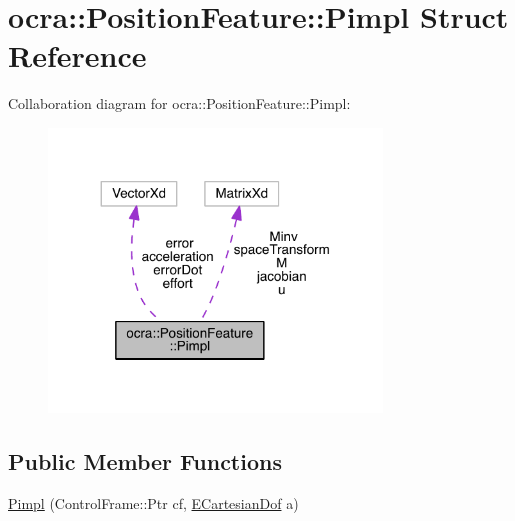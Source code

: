 \hypertarget{structocra_1_1PositionFeature_1_1Pimpl}{}\section{ocra\+:\+:Position\+Feature\+:\+:Pimpl Struct Reference}
\label{structocra_1_1PositionFeature_1_1Pimpl}


Collaboration diagram for ocra\+:\+:Position\+Feature\+:\+:Pimpl\+:\nopagebreak
\begin{figure}[H]
\begin{center}
\leavevmode
\includegraphics[width=251pt]{d0/d59/structocra_1_1PositionFeature_1_1Pimpl__coll__graph}
\end{center}
\end{figure}
\subsection*{Public Member Functions}
\begin{DoxyCompactItemize}
\item 
\hyperlink{structocra_1_1PositionFeature_1_1Pimpl_ad886f374a5f070290519a8ccbaff9ab8}{Pimpl} (Control\+Frame\+::\+Ptr cf, \hyperlink{namespaceocra_a436781c7059a0f76027df1c652126260}{E\+Cartesian\+Dof} a)
\end{DoxyCompactItemize}
